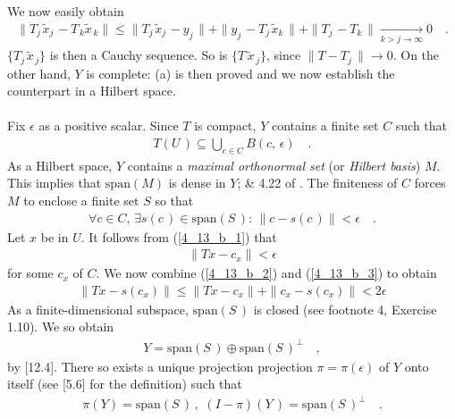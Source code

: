We now easily obtain
\begin{align}\label{4_13_a_3}
\| T_{j\,} \tilde{x}_{j\,}  -T_{\, k} \tilde{x}_{\, k}\| \leq
\| T_{j\,} \tilde{x}_{j\,}- y_{j\,}\| +
\| y_{j\,} -T_{j\,} \tilde{x}_{k\,}\| +
\| T_{j\,} - T_{ k\,}\|   \underset{k> j\to \infty}{\longrightarrow}0\quad .
\end{align}
$\{T_{ j\,} \tilde{x}_{\, j} \}$ is then a Cauchy sequence. So is $\{T \,\tilde{x}_{\, j}\}$, since $\| T-T_{j}\,\| \to 0$. On the other hand, $Y$ is complete: (a) is then proved and we now establish the counterpart in a Hilbert space.\\
\\
Fix $\epsilon$ as a positive scalar. Since $T$ is compact, $Y$ contains a finite set $C$ such that 
\begin{align}\label{4_13_b_1}
T(U\,)\subseteq \bigcup_{c\in C} B(c,\, \epsilon)\quad .
\end{align}
As a Hilbert space, $Y$ contains a \textsl{maximal orthonormal set} (or \textsl{Hilbert basis}) $M$. This implies that $\text{span}(M)$ is dense in $Y$;  \& 4.22 of \cite{Big_Rudin}. The finiteness of $C$ forces $M$ to enclose a finite set $S$ so that 
\begin{align}\label{4_13_b_2}
\forall c\in C, \, \exists  s(c\,) \in \text{span} (S\,):\, \|c - s(c\,)\| <\epsilon\quad .
\end{align}
Let $x$ be in $U$. It follows from (\ref{4_13_b_1}) that 
\begin{align}\label{4_13_b_3}
\|Tx - c_x \| < \epsilon
\end{align}
for some $c_x$ of $C$. We now combine (\ref{4_13_b_2}) and (\ref{4_13_b_3}) to obtain
\begin{align}
\|Tx - s(c_x) \| \leq  \| Tx - c_x \| + \| c_x - s(c_x)\| < 2\epsilon
\end{align}
As a finite-dimensional subspace, $\text{span}(S\,)$ is closed (see footnote 4, Exercise 1.10). We so obtain
\begin{align}
Y=\text{span}(S\,)\oplus \text{span}(S\,)^\bot \quad ,
\end{align}
by [12.4]. There so exists a unique projection projection $\pi=\pi(\epsilon)$ of $Y$ onto itself (see [5.6] for the definition) such that
\begin{align}
\pi (Y) = \text{span}(S\,)\, ,\,  \,  (I-\pi)(Y\,) = \text{span}(S\,)^\bot\quad .
\end{align}
